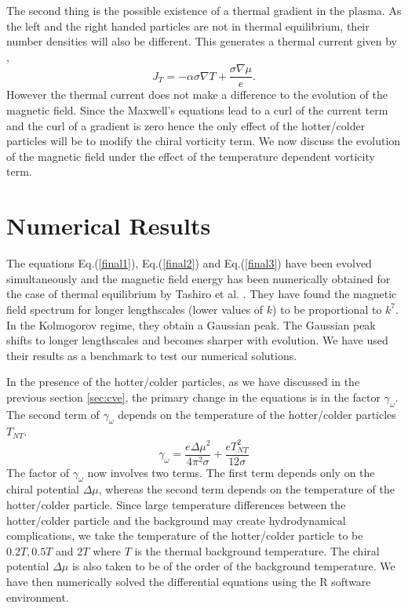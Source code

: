 \documentclass{ws-mpla}
\begin{document}
The second thing is the possible existence of a thermal gradient in the plasma. As the left and the right handed particles are not in thermal equilibrium, their number densities 
will also be different. This generates a thermal current given by \cite{ahonen}, 
\begin{equation}
 J_T = - \alpha \sigma \nabla T + \frac{\sigma \nabla \mu}{e}. 
\end{equation}
However the thermal current does not make a difference to the evolution of the magnetic field. Since the Maxwell's equations lead to 
a curl of the current term and the curl of a gradient is zero hence the only effect of the hotter/colder particles will be to modify the chiral vorticity term. 
We now discuss the evolution of the magnetic field under the effect of the temperature dependent vorticity term.


\section{Numerical Results} 
\label{sec:results}
The equations Eq.(\ref{final1}), Eq.(\ref{final2}) and Eq.(\ref{final3}) have been evolved simultaneously and the magnetic field energy has been numerically 
obtained for the case of thermal equilibrium by Tashiro et al. \cite{tashiro}. 
They have found the magnetic field spectrum for longer lengthscales (lower values of $k$) to be proportional to $k^7$. 
In the Kolmogorov regime, they obtain a Gaussian peak. The Gaussian peak shifts to longer lengthscales and becomes sharper with evolution. We have used their 
results as a benchmark to test our numerical solutions. 


In the presence of the hotter/colder particles, as we have discussed in the previous section \ref{sec:cve}, the primary change in the equations is in the factor  
$\gamma_\omega$. The second term of $\gamma_\omega$ depends on the temperature of the hotter/colder particles $T_{NT}$. 
\begin{equation}
 \gamma_\omega = \frac{e \Delta \mu^2}{4 \pi^2 \sigma} + \frac{eT_{NT}^2}{12 \sigma}
\end{equation}
 The factor of $\gamma_\omega$ now involves two terms. The first term
depends only on the chiral potential $\Delta\mu$, whereas the second term depends on the temperature of the hotter/colder particle. Since large 
temperature differences between the hotter/colder particle and the background may create hydrodynamical complications, we take the temperature of the 
hotter/colder particle to be $0.2 T, 0.5 T$ and $2 T$ where $T$ is the thermal background temperature. The  chiral potential $\Delta\mu$
is also taken to be of the order of the background temperature. We have then numerically solved the differential equations using the R software environment.
\end{document}
